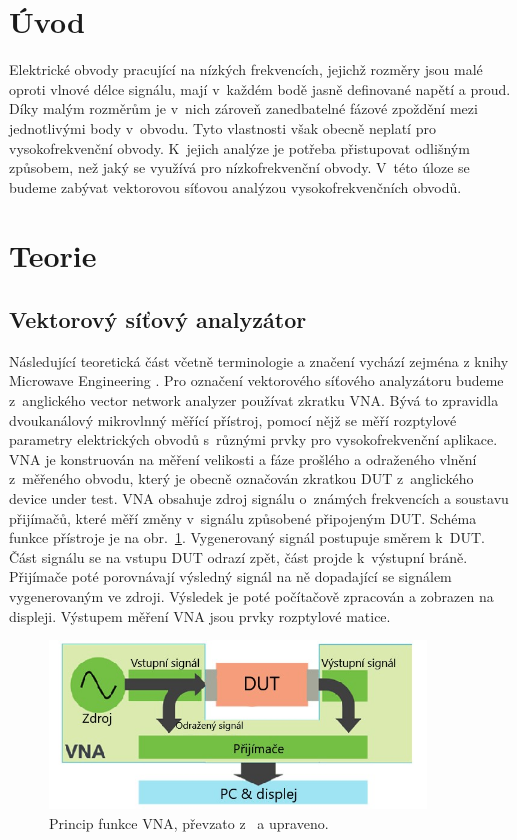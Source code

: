 \documentclass{protokol}
\begin{document}
\headernoenv

\section{Úvod}
Elektrické obvody pracující na nízkých frekvencích,
jejichž rozměry jsou malé oproti vlnové délce signálu,
mají v~každém bodě jasně definované napětí a proud.
Díky malým rozměrům je v~nich zároveň zanedbatelné fázové zpoždění
mezi jednotlivými body v~obvodu.
Tyto vlastnosti však obecně neplatí pro vysokofrekvenční obvody.
K~jejich analýze je potřeba přistupovat odlišným způsobem,
než jaký se využívá pro nízkofrekvenční obvody.
V~této úloze se budeme zabývat vektorovou síťovou analýzou vysokofrekvenčních obvodů.

\section{Teorie}

\subsection{Vektorový síťový analyzátor}

Následující teoretická část včetně terminologie a značení vychází zejména z knihy Microwave Engineering \cite{pozar}.
Pro označení vektorového síťového analyzátoru budeme z~anglického
vector network analyzer používat zkratku VNA.
Bývá to zpravidla dvoukanálový mikrovlnný měřící přístroj,
pomocí nějž se měří rozptylové parametry elektrických obvodů
s~různými prvky pro vysokofrekvenční aplikace.
VNA je konstruován na měření velikosti a fáze prošlého a odraženého vlnění
z~měřeného obvodu,
který je obecně označován zkratkou DUT z~anglického device
under test.
VNA obsahuje zdroj signálu o~známých frekvencích a soustavu přijímačů,
které měří změny v~signálu způsobené připojeným DUT.
Schéma funkce přístroje je na obr.~\ref{VNA}.
Vygenerovaný signál postupuje směrem k~DUT.
Část signálu se na vstupu DUT odrazí zpět, část projde k~výstupní bráně.
Přijímače poté porovnávají výsledný signál na ně dopadající
se signálem vygenerovaným ve zdroji.
Výsledek je poté počítačově zpracován a zobrazen na displeji.
Výstupem měření VNA jsou prvky rozptylové matice.

\begin{figure}[b]
	\centering
	\includegraphics[width=100mm,]{network-analyzer-diagram}
	\caption{Princip funkce VNA, převzato z~\cite{tektronix} a upraveno.}
	\label{VNA}
\end{figure}
\end{document}
